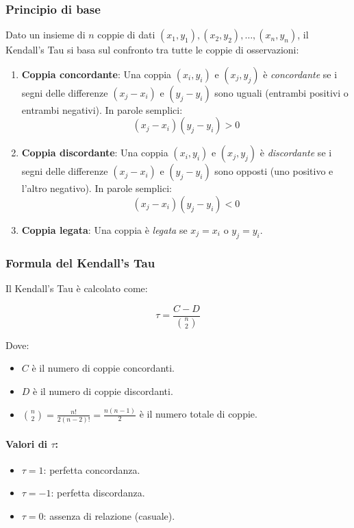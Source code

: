 \documentclass[%
	corpo=11pt,
    twoside,
    stile=classica,
    oldstyle,
    tipotesi=custom,
    greek,
    evenboxes,
]{toptesi}
\begin{document}
\subsubsection{Principio di base}

Dato un insieme di \( n \) coppie di dati \( (x_1, y_1), (x_2, y_2), \dots, (x_n, y_n) \), il Kendall’s Tau si basa sul confronto tra tutte le coppie di osservazioni:

\begin{enumerate}
	\item \textbf{Coppia concordante}: Una coppia \( (x_i, y_i) \) e \( (x_j, y_j) \) è \textit{concordante} se i segni delle differenze \( (x_j - x_i) \) e \( (y_j - y_i) \) sono uguali (entrambi positivi o entrambi negativi). In parole semplici:
	\[
	(x_j - x_i)(y_j - y_i) > 0
	\]
	
	\item \textbf{Coppia discordante}: Una coppia \( (x_i, y_i) \) e \( (x_j, y_j) \) è \textit{discordante} se i segni delle differenze \( (x_j - x_i) \) e \( (y_j - y_i) \) sono opposti (uno positivo e l’altro negativo). In parole semplici:
	\[
	(x_j - x_i)(y_j - y_i) < 0
	\]
	
	\item \textbf{Coppia legata}: Una coppia è \textit{legata} se \( x_j = x_i \) o \( y_j = y_i \).
\end{enumerate}

\subsubsection{Formula del Kendall’s Tau}

Il Kendall’s Tau è calcolato come:

\[
\tau = \frac{C - D}{\binom{n}{2}}
\]

Dove:
\begin{itemize}
	\item \( C \) è il numero di coppie concordanti.
	\item \( D \) è il numero di coppie discordanti.
	\item \( \binom{n}{2} = \frac{n!}{2(n-2)!} = \frac{n(n-1)}{2} \) è il numero totale di coppie.
\end{itemize}

\paragraph{Valori di \( \tau \):}
\begin{itemize}
	\item \( \tau = 1 \): perfetta concordanza.
	\item \( \tau = -1 \): perfetta discordanza.
	\item \( \tau = 0 \): assenza di relazione (casuale).
\end{itemize}
\end{document}
